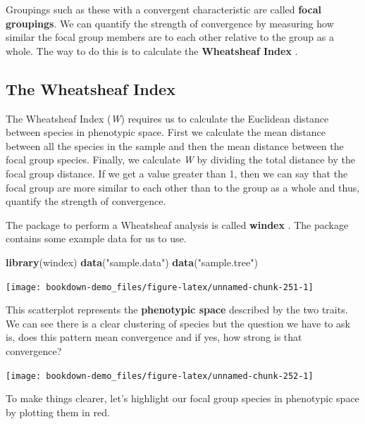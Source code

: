 \documentclass[
]{book}
\newenvironment{Shaded}{\begin{snugshade}}{\end{snugshade}}
\newcommand{\KeywordTok}[1]{\textcolor[rgb]{0.13,0.29,0.53}{\textbf{#1}}}
\newcommand{\NormalTok}[1]{#1}
\newcommand{\StringTok}[1]{\textcolor[rgb]{0.31,0.60,0.02}{#1}}
\begin{document}
Groupings such as these with a convergent characteristic are called \textbf{focal groupings}. We can quantify the strength of convergence by measuring how similar the focal group members are to each other relative to the group as a whole. The way to do this is to calculate the \textbf{Wheatsheaf Index} \citep{Arbuckle14}.

\hypertarget{the-wheatsheaf-index}{%
\subsection{The Wheatsheaf Index}\label{the-wheatsheaf-index}}

The Wheatsheaf Index (\emph{W}) requires us to calculate the Euclidean distance between species in phenotypic space. First we calculate the mean distance between all the species in the sample and then the mean distance between the focal group species. Finally, we calculate \emph{W} by dividing the total distance by the focal group distance. If we get a value greater than 1, then we can say that the focal group are more similar to each other than to the group as a whole and thus, quantify the strength of convergence.

The package to perform a Wheatsheaf analysis is called \textbf{windex} \citep{windex}. The package contains some example data for us to use.

\begin{Shaded}
\begin{Highlighting}[]
\KeywordTok{library}\NormalTok{(windex)}
\KeywordTok{data}\NormalTok{(}\StringTok{"sample.data"}\NormalTok{)}
\KeywordTok{data}\NormalTok{(}\StringTok{"sample.tree"}\NormalTok{)}
\end{Highlighting}
\end{Shaded}

\begin{center}\texttt{[image: bookdown-demo\_files/figure-latex/unnamed-chunk-251-1]} \end{center}

This scatterplot represents the \textbf{phenotypic space} described by the two traits. We can see there is a clear clustering of species but the question we have to ask is, does this pattern mean convergence and if yes, how strong is that convergence?

\begin{center}\texttt{[image: bookdown-demo\_files/figure-latex/unnamed-chunk-252-1]} \end{center}

To make things clearer, let's highlight our focal group species in phenotypic space by plotting them in red.
\end{document}
